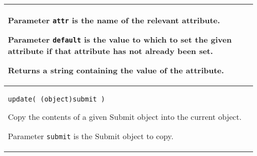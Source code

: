 \begin{flushleft}
\begin{tabular}{|p{16cm}|}
Parameter \texttt{attr} is the name of the relevant attribute.

Parameter \texttt{default} is the value to which to set the given
attribute if that attribute has not already been set.

Returns a string containing the value of the attribute.

\\ \hline
\texttt{update( (object)submit )}

Copy the contents of a given Submit object into the current object.

Parameter \texttt{submit} is the Submit object to copy.

\\ \hline
\end{tabular}
\end{flushleft}


